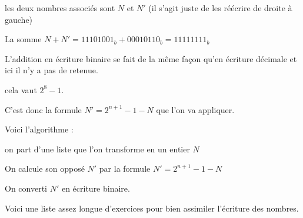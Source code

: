 les deux nombres associés sont
$N$ et $N'$ (il s'agit juste de les réécrire de droite à gauche)

\change

La somme $N + N' = 11101001_b + 00010110_b = 11111111_b $

L'addition en écriture binaire se fait de la même façon qu'en écriture décimale et 
ici il n'y a pas de retenue.

\change

cela vaut $2^{8}-1$. 

\change

C'est donc la formule $N' = 2^{n+1}-1 - N$  que l'on va appliquer.

\change

Voici l'algorithme : 

on part d'une liste que l'on transforme en un entier $N$

On calcule son opposé $N'$ par la formule  $N' = 2^{n+1}-1 - N$ 

On converti $N'$ en écriture binaire.

\diapo

Voici une liste assez longue d'exercices pour bien assimiler l'écriture des nombres. 



